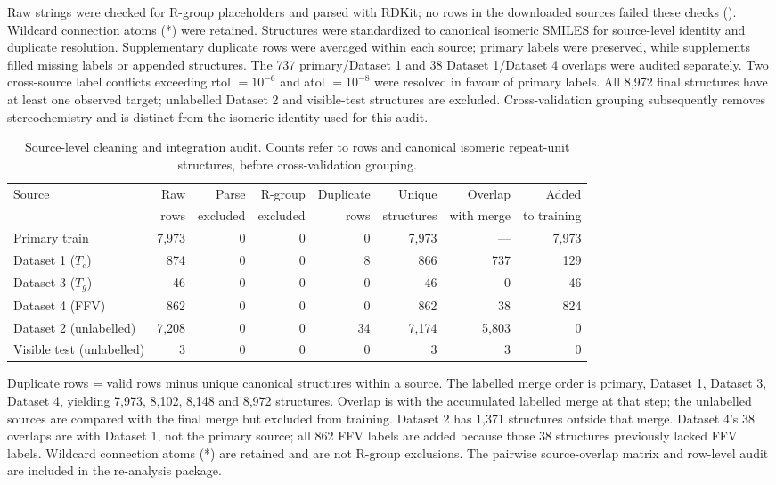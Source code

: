 \documentclass{article}
\begin{document}
Raw strings were checked for R-group placeholders and parsed with RDKit; no rows in the downloaded sources failed these checks (). Wildcard connection atoms (*) were retained. Structures were standardized to canonical isomeric SMILES for source-level identity and duplicate resolution. Supplementary duplicate rows were averaged within each source; primary labels were preserved, while supplements filled missing labels or appended structures. The 737 primary/Dataset 1 and 38 Dataset 1/Dataset 4 overlaps were audited separately. Two cross-source label conflicts exceeding rtol $=10^{-6}$ and atol $=10^{-8}$ were resolved in favour of primary labels. All 8{,}972 final structures have at least one observed target; unlabelled Dataset 2 and visible-test structures are excluded. Cross-validation grouping subsequently removes stereochemistry and is distinct from the isomeric identity used for this audit.
\begin{table}[H]
\centering
\caption{Source-level cleaning and integration audit. Counts refer to rows and canonical isomeric repeat-unit structures, before cross-validation grouping.}
\label{tab:source_audit}
\scriptsize
\setlength{\tabcolsep}{3pt}
\begin{tabular}{lrrrrrrr}
\toprule
Source & Raw & Parse & R-group & Duplicate & Unique & Overlap & Added \\
 & rows & excluded & excluded & rows & structures & with merge & to training \\
\midrule
Primary train & 7,973 & 0 & 0 & 0 & 7,973 & --- & 7,973 \\
Dataset 1 ($T_c$) & 874 & 0 & 0 & 8 & 866 & 737 & 129 \\
Dataset 3 ($T_g$) & 46 & 0 & 0 & 0 & 46 & 0 & 46 \\
Dataset 4 (FFV) & 862 & 0 & 0 & 0 & 862 & 38 & 824 \\
Dataset 2 (unlabelled) & 7,208 & 0 & 0 & 34 & 7,174 & 5,803 & 0 \\
Visible test (unlabelled) & 3 & 0 & 0 & 0 & 3 & 3 & 0 \\
\bottomrule
\end{tabular}

\vspace{0.5em}
\footnotesize
Duplicate rows = valid rows minus unique canonical structures within a source. The labelled merge order is primary, Dataset 1, Dataset 3, Dataset 4, yielding 7,973, 8,102, 8,148 and 8,972 structures. Overlap is with the accumulated labelled merge at that step; the unlabelled sources are compared with the final merge but excluded from training. Dataset 2 has 1,371 structures outside that merge. Dataset 4's 38 overlaps are with Dataset 1, not the primary source; all 862 FFV labels are added because those 38 structures previously lacked FFV labels. Wildcard connection atoms (*) are retained and are not R-group exclusions. The pairwise source-overlap matrix and row-level audit are included in the re-analysis package.
\end{table}
\end{document}
